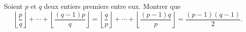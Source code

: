 Soient $p$ et $q$ deux entiers premiers entre eux. Montrer que
\[ \left\lfloor \frac{p}{q} \right\rfloor + \cdots + \left\lfloor \frac{(q - 1)p}{q} \right\rfloor = \left\lfloor \frac{q}{p} \right\rfloor + \cdots + \left\lfloor \frac{(p - 1)q}{p} \right\rfloor = \frac{(p - 1)(q - 1)}{2}. \]
